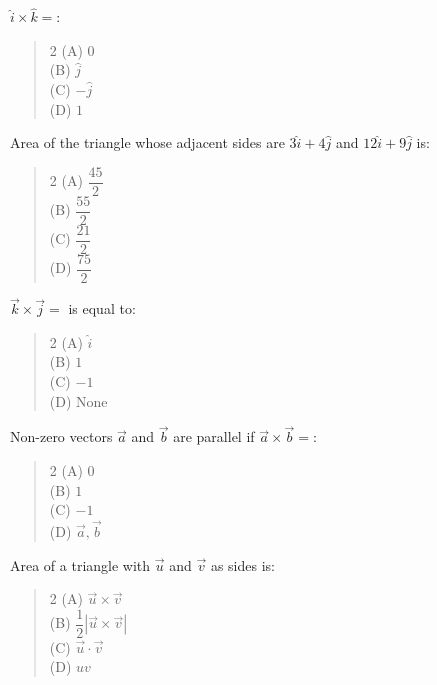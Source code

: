 \documentclass[11pt,a4paper]{article}
\begin{document}
\begin{mcqlist}
\item $\hat{i}\times\hat{k}=$:
\begin{quote}\begin{multicols}{2}
\noindent (A) $0$ \\
(B) $\hat{j}$ \\
(C) $-\hat{j}$ \\
(D) $1$
\end{multicols}\end{quote}

\item Area of the triangle whose adjacent sides are $3\hat{i}+4\hat{j}$ and $12\hat{i}+9\hat{j}$ is:
\begin{quote}\begin{multicols}{2}
\noindent (A) $\dfrac{45}{2}$ \\
(B) $\dfrac{55}{2}$ \\
(C) $\dfrac{21}{2}$ \\
(D) $\dfrac{75}{2}$
\end{multicols}\end{quote}

\item $\vec{k}\times\vec{j}=$ is equal to:
\begin{quote}\begin{multicols}{2}
\noindent (A) $\hat{i}$ \\
(B) $1$ \\
(C) $-1$ \\
(D) None
\end{multicols}\end{quote}

\item Non-zero vectors $\vec{a}$ and $\vec{b}$ are parallel if $\vec{a}\times\vec{b}=$:
\begin{quote}\begin{multicols}{2}
\noindent (A) $0$ \\
(B) $1$ \\
(C) $-1$ \\
(D) $\vec{a},\vec{b}$
\end{multicols}\end{quote}

\item Area of a triangle with $\vec{u}$ and $\vec{v}$ as sides is:
\begin{quote}\begin{multicols}{2}
\noindent (A) $\vec{u}\times\vec{v}$ \\
(B) $\dfrac{1}{2}|\vec{u}\times\vec{v}|$ \\
(C) $\vec{u}\cdot\vec{v}$ \\
(D) $uv$
\end{multicols}\end{quote}


\end{mcqlist}
\end{document}

